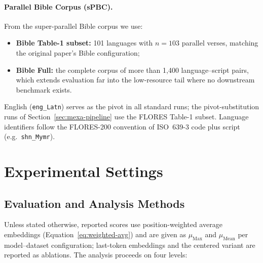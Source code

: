 \paragraph{Parallel Bible Corpus (sPBC).}
From the super-parallel Bible corpus \citep{mayer2014bible} we use:
\begin{itemize}
    \item \textbf{Bible Table-1 subset:} 101 languages with $n = 103$
    parallel verses, matching the original paper's Bible configuration;
    \item \textbf{Bible Full:} the complete corpus of more than 1{,}400
    language--script pairs, which extends evaluation far into the
    low-resource tail where no downstream benchmark exists.
\end{itemize}

English (\texttt{eng\_Latn}) serves as the pivot in all standard runs; the
pivot-substitution runs of Section~\ref{sec:mexa-pipeline} use the FLORES
Table-1 subset. Language identifiers follow the FLORES-200 convention of
ISO~639-3 code plus script (e.g.\ \texttt{shn\_Mymr}).

\section{Experimental Settings}
\label{sec:experimental-settings}

\subsection{Evaluation and Analysis Methods}
\label{subsec:analysis-methods}

Unless stated otherwise, reported scores use position-weighted average
embeddings (Equation~\eqref{eq:weighted-avg}) and are given as
$\mu_{\text{Max}}$ and $\mu_{\text{Mean}}$ per model--dataset
configuration; last-token embeddings and the centered variant are reported
as ablations. The analysis proceeds on four levels:

